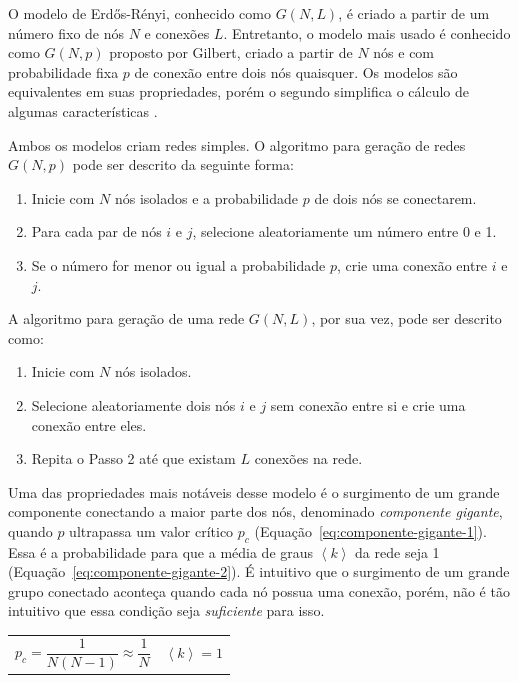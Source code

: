 \documentclass[12pt,a4paper,final]{article}
\newcommand{\avg}[1]{\left\langle #1 \right\rangle} %
\begin{document}
O modelo de Erdős-Rényi, conhecido como $G(N,L)$, é criado a partir de um número fixo de nós $N$ e conexões $L$. Entretanto, o modelo mais usado é conhecido como $G(N,p)$ proposto por Gilbert, criado a partir de $N$ nós e com probabilidade fixa $p$ de conexão entre dois nós quaisquer. Os modelos são equivalentes em suas propriedades, porém o segundo simplifica o cálculo de algumas características \cite{Barabasi2016-rn}.

Ambos os modelos criam redes simples. O algoritmo para geração de redes $G(N, p)$ pode ser descrito da seguinte forma:

\begin{enumerate}
\item Inicie com $N$ nós isolados e a probabilidade $p$ de dois nós se conectarem.

\item Para cada par de nós $i$ e $j$, selecione aleatoriamente um número entre 0 e 1.

\item Se o número for menor ou igual a probabilidade $p$, crie uma conexão entre $i$ e $j$.
\end{enumerate}

A algoritmo para geração de uma rede $G(N, L)$, por sua vez,  pode ser descrito como:

\begin{enumerate}
\item Inicie com $N$ nós isolados.
\item Selecione aleatoriamente dois nós $i$ e $j$ sem conexão entre si e crie uma conexão entre eles.
\item Repita o Passo 2 até que existam $L$ conexões na rede.
\end{enumerate}

Uma das propriedades mais notáveis desse modelo é o surgimento de um grande componente conectando a maior parte dos nós, denominado \textit{componente gigante}, quando $p$ ultrapassa um valor crítico $p_c$ (Equação~\ref{eq:componente-gigante-1}). Essa é a probabilidade para que a média de graus $\avg{k}$ da rede seja 1 (Equação~\ref{eq:componente-gigante-2}). É intuitivo que o surgimento de um grande grupo conectado aconteça quando cada nó possua uma conexão, porém, não é tão intuitivo que essa condição seja \textit{suficiente} para isso.

\noindent
\begin{tabularx}{\linewidth}{@{}XX@{}}
    \begin{equation} \label{eq:componente-gigante-1}
        p_c = \frac{1}{N(N - 1)} \approx \frac{1}{N}
    \end{equation} &
    \begin{equation} \label{eq:componente-gigante-2}
        \avg{k} = 1
    \end{equation}
\end{tabularx}
\end{document}
